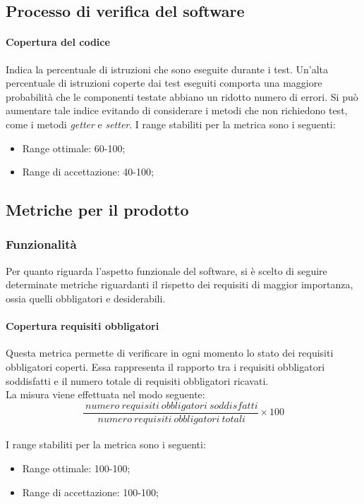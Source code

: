 				\subsection[Processo di verifica del software]{\hypertarget{pvs}{Processo di verifica del software}}
				
			\paragraph[Copertura del codice]{\hypertarget{cco}{Copertura del codice}}
			Indica la percentuale di istruzioni che sono eseguite durante i test. Un'alta percentuale di istruzioni coperte dai test eseguiti comporta una maggiore probabilità che le componenti testate abbiano un ridotto numero di errori. Si può aumentare tale indice evitando di considerare i metodi che non richiedono test, come i metodi \textit{getter} e \textit{setter}.
			I range stabiliti per la metrica sono i seguenti:
				\begin{itemize}
					\item Range ottimale: 60-100;
					\item Range di accettazione: 40-100;
				\end{itemize}
				
	\subsection{Metriche per il prodotto}
		\subsubsection{Funzionalità \label{S1}}
		Per quanto riguarda l'aspetto funzionale del software, si è scelto di seguire determinate metriche riguardanti il rispetto dei requisiti di maggior importanza, ossia quelli obbligatori e desiderabili.
			\paragraph[Copertura requisiti obbligatori]{\hypertarget{cro}{Copertura requisiti obbligatori}}
			Questa metrica permette di verificare in ogni momento lo stato dei requisiti obbligatori coperti. Essa rappresenta il rapporto tra i requisiti obbligatori soddisfatti e il numero totale di requisiti obbligatori ricavati.
			\\La misura viene effettuata nel modo seguente:
			\begin{equation}
			\frac{~numero~requisiti~obbligatori~soddisfatti}{~numero~requisiti~obbligatori~totali}\times{100}
			\end{equation}
			\\I range stabiliti per la metrica sono i seguenti:
			\begin{itemize}
				\item Range ottimale: 100-100;
				\item Range di accettazione: 100-100;
			\end{itemize}
			
